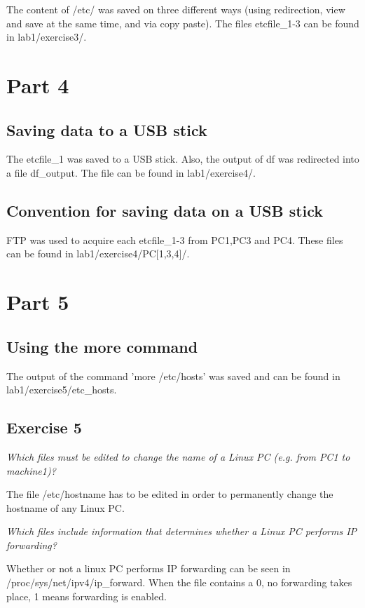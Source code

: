 \documentclass[a4paper, 11pt]{article}
\begin{document}
The content of /etc/ was saved on three different ways (using redirection, view and save at the same time, and via copy paste).
The files etcfile_1-3 can be found in lab1/exercise3/.

\section{Part 4}

\subsection {Saving data to a USB stick}

The etcfile_1 was saved to a USB stick. Also, the output of df was redirected into a file df_output. The file can be
found in lab1/exercise4/.

\subsection {Convention for saving data on a USB stick}

FTP was used to acquire each etcfile_1-3 from PC1,PC3 and PC4. These files can be found in lab1/exercise4/PC[1,3,4]/.

\section{Part 5}

\subsection{Using the more command}

The output of the command 'more /etc/hosts' was saved and can be found in lab1/exercise5/etc_hosts.

\subsection{Exercise 5}

\emph{Which files must be edited to change the name of a Linux PC (e.g. from PC1 to machine1)?}

The file /etc/hostname has to be edited in order to permanently change the hostname of any Linux PC.

\emph{Which files include information that determines whether a Linux PC performs IP forwarding?}

Whether or not a linux PC performs IP forwarding can be seen in /proc/sys/net/ipv4/ip_forward. When the file contains a 0,
no forwarding takes place, 1 means forwarding is enabled.
\end{document}
